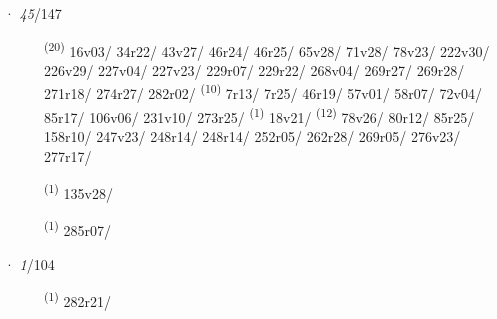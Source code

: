 \ENTRYEND
\noindent{} · \textit{45}/147 \LEMMALINE
\begin{description}
    \item[]  \textsuperscript{(20)} \mbox{16v03/} \mbox{34r22/} \mbox{43v27/} \mbox{46r24/} \mbox{46r25/} \mbox{65v28/} \mbox{71v28/} \mbox{78v23/} \mbox{222v30/} \mbox{226v29/} \mbox{227v04/} \mbox{227v23/} \mbox{229r07/} \mbox{229r22/} \mbox{268v04/} \mbox{269r27/} \mbox{269r28/} \mbox{271r18/} \mbox{274r27/} \mbox{282r02/} \CASEBREAK {} \textsuperscript{(10)} \mbox{7r13/} \mbox{7r25/} \mbox{46r19/} \mbox{57v01/} \mbox{58r07/} \mbox{72v04/} \mbox{85r17/} \mbox{106v06/} \mbox{231v10/} \mbox{273r25/} \CASEBREAK {} \textsuperscript{(1)} \mbox{18v21/} \textsuperscript{(12)} \mbox{78v26/} \mbox{80r12/} \mbox{85r25/} \mbox{158r10/} \mbox{247v23/} \mbox{248r14/} \mbox{248r14/} \mbox{252r05/} \mbox{262r28/} \mbox{269r05/} \mbox{276v23/} \mbox{277r17/}
    \item[]  \textsuperscript{(1)} \mbox{135v28/}
    \item[]  \textsuperscript{(1)} \mbox{285r07/}
\end{description}
\ENTRYEND
\noindent{} · \textit{1}/104 \LEMMALINE
\begin{description}
    \item[]  \textsuperscript{(1)} \mbox{282r21/}
\end{description}
\ENTRYEND
